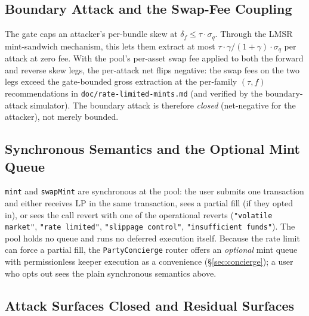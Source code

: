 \documentclass[11pt]{article}
\begin{document}
\subsection{Boundary Attack and the Swap-Fee Coupling}

The gate caps an attacker's per-bundle skew at $\delta_f \le \tau
\cdot \sigma_q$. Through the LMSR mint-sandwich mechanism, this lets
them extract at most $\tau \cdot \gamma/(1+\gamma) \cdot \sigma_q$ per
attack at zero fee. With the pool's per-asset swap fee applied to
both the forward and reverse skew legs, the per-attack net flips
negative: the swap fees on the two legs exceed the gate-bounded gross
extraction at the per-family $(\tau, f)$ recommendations in
\texttt{doc/rate-limited-mints.md} (and verified by the
boundary-attack simulator). The boundary attack is therefore
\emph{closed} (net-negative for the attacker), not merely bounded.

\subsection{Synchronous Semantics and the Optional Mint Queue}

\texttt{mint} and \texttt{swapMint} are synchronous at the pool: the
user submits one transaction and either receives LP in the same
transaction, sees a partial fill (if they opted in), or sees the call
revert with one of the operational reverts (\texttt{"volatile market"},
\texttt{"rate limited"}, \texttt{"slippage control"},
\texttt{"insufficient funds"}). The pool holds no queue and runs no
deferred execution itself. Because the rate limit can force a partial
fill, the \texttt{PartyConcierge} router offers an \emph{optional} mint
queue with permissionless keeper execution as a convenience
(\S\ref{sec:concierge}); a user who opts out sees the plain synchronous
semantics above.

\subsection{Attack Surfaces Closed and Residual Surfaces}
\end{document}
